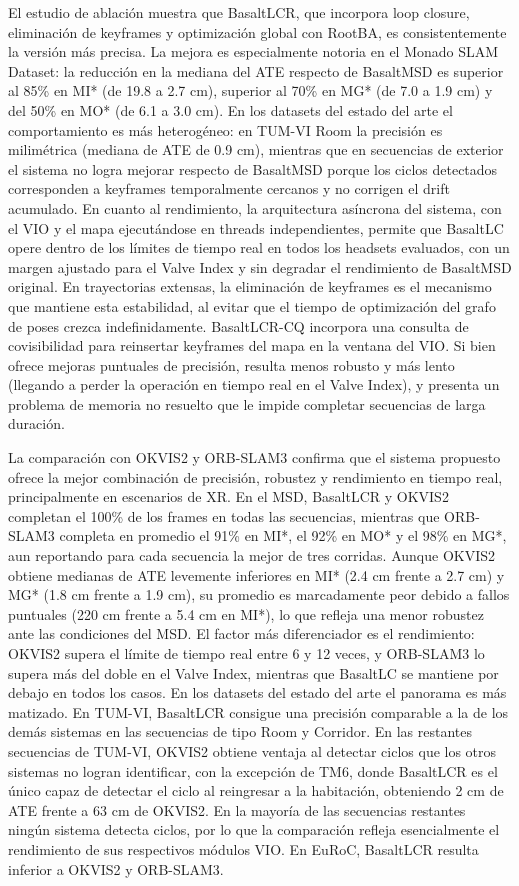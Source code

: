 El estudio de ablación muestra que BasaltLCR, que incorpora loop closure, eliminación de keyframes y optimización global con RootBA, es consistentemente la versión más precisa. La mejora es especialmente notoria en el Monado SLAM Dataset: la reducción en la mediana del ATE respecto de BasaltMSD es superior al 85\% en MI* (de 19.8 a 2.7 cm), superior al 70\% en MG* (de 7.0 a 1.9 cm) y del 50\% en MO* (de 6.1 a 3.0 cm). En los datasets del estado del arte el comportamiento es más heterogéneo: en TUM-VI Room la precisión es milimétrica (mediana de ATE de 0.9 cm), mientras que en secuencias de exterior el sistema no logra mejorar respecto de BasaltMSD porque los ciclos detectados corresponden a keyframes temporalmente cercanos y no corrigen el drift acumulado. En cuanto al rendimiento, la arquitectura asíncrona del sistema, con el VIO y el mapa ejecutándose en threads independientes, permite que BasaltLC opere dentro de los límites de tiempo real en todos los headsets evaluados, con un margen ajustado para el Valve Index y sin degradar el rendimiento de BasaltMSD original. En trayectorias extensas, la eliminación de keyframes es el mecanismo que mantiene esta estabilidad, al evitar que el tiempo de optimización del grafo de poses crezca indefinidamente. BasaltLCR-CQ incorpora una consulta de covisibilidad para reinsertar keyframes del mapa en la ventana del VIO. Si bien ofrece mejoras puntuales de precisión, resulta menos robusto y más lento (llegando a perder la operación en tiempo real en el Valve Index), y presenta un problema de memoria no resuelto que le impide completar secuencias de larga duración.

La comparación con OKVIS2 y ORB-SLAM3 confirma que el sistema propuesto ofrece la mejor combinación de precisión, robustez y rendimiento en tiempo real, principalmente en escenarios de XR. En el MSD, BasaltLCR y OKVIS2 completan el 100\% de los frames en todas las secuencias, mientras que ORB-SLAM3 completa en promedio el 91\% en MI*, el 92\% en MO* y el 98\% en MG*, aun reportando para cada secuencia la mejor de tres corridas. Aunque OKVIS2 obtiene medianas de ATE levemente inferiores en MI* (2.4 cm frente a 2.7 cm) y MG* (1.8 cm frente a 1.9 cm), su promedio es marcadamente peor debido a fallos puntuales (220 cm frente a 5.4 cm en MI*), lo que refleja una menor robustez ante las condiciones del MSD. El factor más diferenciador es el rendimiento: OKVIS2 supera el límite de tiempo real entre 6 y 12 veces, y ORB-SLAM3 lo supera más del doble en el Valve Index, mientras que BasaltLC se mantiene por debajo en todos los casos. En los datasets del estado del arte el panorama es más matizado. En TUM-VI, BasaltLCR consigue una precisión comparable a la de los demás sistemas en las secuencias de tipo Room y Corridor. En las restantes secuencias de TUM-VI, OKVIS2 obtiene ventaja al detectar ciclos que los otros sistemas no logran identificar, con la excepción de TM6, donde BasaltLCR es el único capaz de detectar el ciclo al reingresar a la habitación, obteniendo 2 cm de ATE frente a 63 cm de OKVIS2. En la mayoría de las secuencias restantes ningún sistema detecta ciclos, por lo que la comparación refleja esencialmente el rendimiento de sus respectivos módulos VIO. En EuRoC, BasaltLCR resulta inferior a OKVIS2 y ORB-SLAM3.

